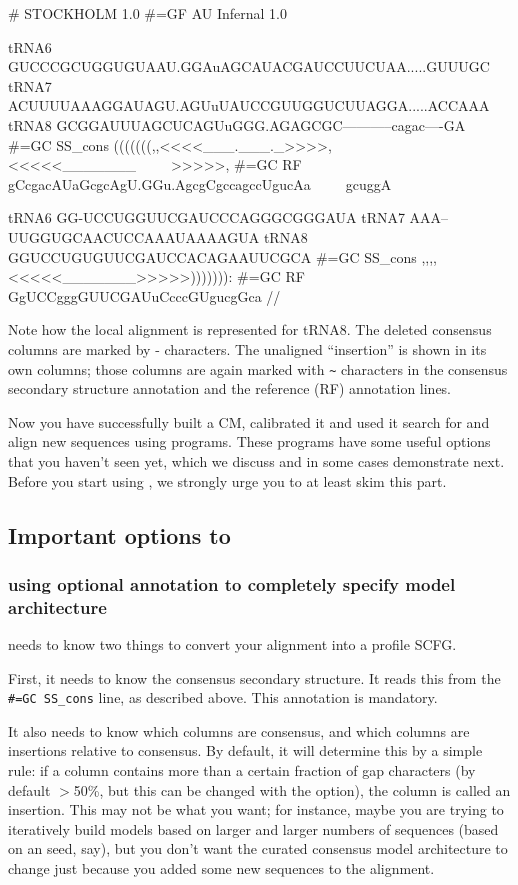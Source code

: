 {\samepage
\begin{sreoutput}
# STOCKHOLM 1.0
#=GF AU Infernal 1.0

tRNA6        GUCCCGCUGGUGUAAU.GGAuAGCAUACGAUCCUUCUAA.....GUUUGC
tRNA7        ACUUUUAAAGGAUAGU.AGUuUAUCCGUUGGUCUUAGGA.....ACCAAA
tRNA8        GCGGAUUUAGCUCAGUuGGG.AGAGCGC-----------cagac----GA
#=GC SS_cons (((((((,,<<<<___.___._>>>>,<<<<<_______~~~~~>>>>>,
#=GC RF      gCcgacAUaGcgcAgU.GGu.AgcgCgccagccUgucAa~~~~~gcuggA

tRNA6        GG-UCCUGGUUCGAUCCCAGGGCGGGAUA
tRNA7        AAA--UUGGUGCAACUCCAAAUAAAAGUA
tRNA8        GGUCCUGUGUUCGAUCCACAGAAUUCGCA
#=GC SS_cons ,,,,<<<<<_______>>>>>))))))):
#=GC RF      GgUCCgggGUUCGAUuCcccGUgucgGca
//
\end{sreoutput}
}

Note how the local alignment is represented for tRNA8. The deleted
consensus columns are marked by - characters. The unaligned
``insertion'' is shown in its own columns; those columns are again
marked with \verb+~+ characters in the consensus secondary structure
annotation and the reference (RF) annotation lines.

Now you have successfully built a CM, calibrated it and used it search
for and align new sequences using  programs.
These programs have some useful options that you haven't seen
yet, which we discuss and in some cases demonstrate next. Before you
start using , we strongly urge you to at
least skim this part. 

\subsection{Important options to }

\subsubsection{using optional annotation to completely specify model architecture}

 needs to know two things to convert your alignment into
a profile SCFG.

First, it needs to know the consensus secondary structure. It reads
this from the {\small\verb+#=GC SS_cons+} line, as described
above. This annotation is mandatory.

It also needs to know which columns are consensus, and which columns
are insertions relative to consensus. By default, it will determine
this by a simple rule: if a column contains more than a certain
fraction of gap characters (by default $>$50\%, but this can be changed
with the  option), the column is called an
insertion. This may not be what you want; for instance, maybe you are
trying to iteratively build models based on larger and larger numbers
of sequences (based on an  seed, say), but you don't
want the curated consensus model architecture to change just because
you added some new sequences to the alignment.

